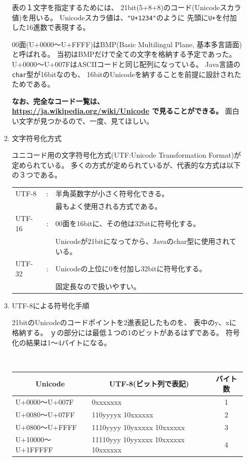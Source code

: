 \documentclass[a4j,dvipdfmx]{jarticle}
\begin{document}
\begin{enumerate}
\begin{enumerate}
表の１文字を指定するためには、
21bit(5+8+8)のコード(Unicodeスカラ値)を用いる。
Unicodeスカラ値は、\verb/"U+1234"/のように
先頭に\verb/U+/を付加した16進数で表現する。

00面(U+0000〜U+FFFF)はBMP(Basic Multilingul Plane, 基本多言語面)と呼ばれる。
当初はBMPだけで全ての文字を格納する予定であった。
U+0000〜U+007FはASCIIコードと同じ配列になっている。
Java言語の\verb/char/型が16bitなのも、
16bitのUnicodeを納することを前提に設計されたためである。

{\bf なお、完全なコード一覧は、
\url{https://ja.wikipedia.org/wiki/Unicode}
で見ることができる。}
面白い文字が見つかるので、一度、見てほしい。

\item 文字符号化方式

ユニコード用の文字符号化方式(UTF:Unicode Transformation Format)が
定められている。
多くの方式が定められているが、代表的な方式は以下の３つである。

\begin{tabular}{l c l }
UTF-8  & : & 半角英数字が小さく符号化できる。\\
       &   & 最もよく使用される方式である。\\
UTF-16 & : & 00面を16bitに、その他は32bitに符号化する。\\
       &   & Unicodeが21bitになってから、Javaのchar型に使用されている。\\
UTF-32 & : & Unicodeの上位に0を付加し32bitに符号化する。\\
       &   & 固定長なので扱いやすい。\\
\end{tabular}

\item UTF-8による符号化手順

21bitのUnicodeのコードポイントを2進表記したものを、
表中のy、xに格納する。
ｙの部分には最低１つの1のビットがあるはずである。
符号化の結果は1〜4バイトになる。

{\tt%
\begin{tabular}{|l|l|c|}
\hline
\multicolumn{1}{|c}{Unicode} &
\multicolumn{1}{|c}{UTF-8(ビット列で表記)} &
\multicolumn{1}{|c|}{バイト数} \\
\hline
U+0000〜U+007F        & 0xxxxxxx                                         & 1 \\
U+0080〜U+07FF        & 110yyyyx 10xxxxxx                                & 2 \\
U+0800〜U+FFFF        & 1110yyyy 10yxxxxx 10xxxxxx                       & 3 \\
U+10000〜U+1FFFFF     & 11110yyy 10yyxxxx 10xxxxxx 10xxxxxx              & 4 \\
\hline
\end{tabular}}

\end{enumerate}

\end{enumerate}
\end{document}
